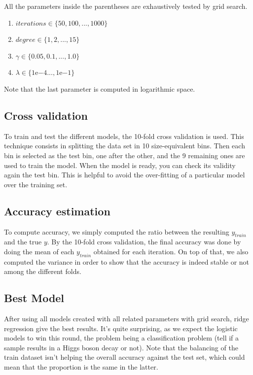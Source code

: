 \documentclass[10pt,conference,compsocconf]{IEEEtran}
\begin{document}
All the parameters inside the parentheses are exhaustively tested by grid search. 

\begin{enumerate}
\item $iterations \in \{50, 100, ... , 1000\}$
\item $degree \in \{1, 2, ... , 15\}$
\item $\gamma \in \{0.05, 0.1, ... , 1.0\}$
\item $\lambda \in \{1\mathrm{e}{-4} ... , 1\mathrm{e}{-1}\}$
\end{enumerate}

Note that the last parameter is computed in logarithmic space.

\subsection{Cross validation}

To train and test the different models, the 10-fold cross validation is used. This technique consists in splitting the data set in 10 size-equivalent bins. Then each bin is selected as the test bin, one after the other, and the 9 remaining ones are used to train the model. When the model is ready, you can check its validity again the test bin. This is helpful to avoid the over-fitting of a particular model over the training set.

\subsection{Accuracy estimation}

To compute accuracy, we simply computed the ratio between the resulting $y_{train}$ and the true $y$. By the 10-fold cross validation, the final accuracy was done by doing the mean of each $y_{train}$ obtained for each iteration. On top of that, we also computed the variance in order to show that the accuracy is indeed stable or not among the different folds.

\subsection{Best Model}

After using all models created with all related parameters with grid search, ridge regression give the best results. It's quite surprising, as we expect the logistic models to win this round, the problem being a classification problem (tell if a sample results in a Higgs boson decay or not). Note that the balancing of the train dataset isn't helping the overall accuracy against the test set, which could mean that the proportion is the same in the latter.
\end{document}
